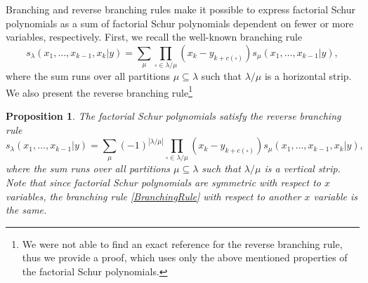 \documentclass[12pt]{amsart}
\newtheorem{prop}{Proposition}[section]
\numberwithin{equation}{section}
\numberwithin{figure}{section}
\begin{document}
\noindent Branching and reverse branching rules make it possible to express factorial Schur polynomials as a sum of factorial Schur polynomials dependent on fewer or more variables, respectively. First, we recall the well-known branching rule
\begin{equation}\label{BranchingRule}
    s_{\lambda}(x_1, \ldots, x_{k-1},x_k|y) = \sum\limits_{\mu} \prod\limits_{\square \in \lambda / \mu}(x_k - y_{k + c(\square)}) s_{\mu}(x_1, \ldots, x_{k-1}|y),
\end{equation}
where the sum runs over all partitions $\mu \subseteq \lambda$ such that $\lambda / \mu$ is a horizontal strip. We also present the reverse branching rule\footnote{We were not able to find an exact reference for the reverse branching rule, thus we provide a proof, which uses only the above mentioned properties of the factorial Schur polynomials.}
\begin{prop}
The factorial Schur polynomials satisfy the reverse branching rule
\begin{equation}\label{ReverseBranching}
    s_{\lambda}(x_1, \ldots, x_{k - 1}|y) = \sum\limits_{\mu}(-1)^{|\lambda/\mu|}\prod\limits_{\square \in \lambda / \mu}(x_k - y_{k + c(\square)}) s_{\mu}(x_1, \ldots, x_{k - 1}, x_k|y),
\end{equation}
where the sum runs over all partitions $\mu \subseteq \lambda$ such that $\lambda / \mu$ is a vertical strip. Note that since factorial Schur polynomials are symmetric with respect to $x$ variables, the branching rule \eqref{BranchingRule} with respect to another $x$ variable is the same.
\end{prop}
\end{document}
